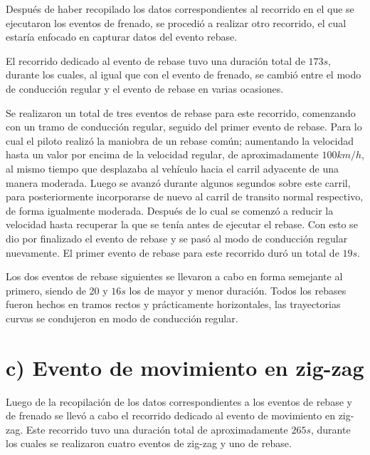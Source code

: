 Después de haber recopilado los datos correspondientes al recorrido en el que se ejecutaron los eventos de frenado, se procedió a realizar otro recorrido, el cual estaría enfocado en capturar datos del evento rebase.

El recorrido dedicado al evento de rebase tuvo una duración total de $173s$, durante los cuales, al igual que con el evento de frenado, se cambió entre el modo de conducción regular y el evento de rebase en varias ocasiones. 

Se realizaron un total de tres eventos de rebase para este recorrido, comenzando con un tramo de conducción regular, seguido del primer evento de rebase. 
Para lo cual el piloto realizó la maniobra de un rebase común; aumentando la velocidad hasta un valor por encima de la velocidad regular, de aproximadamente $100km/h$, al mismo tiempo que desplazaba al vehículo hacia el carril adyacente de una manera moderada. 
Luego se avanzó durante algunos segundos sobre este carril, para posteriormente incorporarse de nuevo al carril de transito normal respectivo, de forma igualmente moderada. 
Después de lo cual se comenzó a reducir la velocidad hasta recuperar la que se tenía antes de ejecutar el rebase. 
Con esto se dio por finalizado el evento de rebase y se pasó al modo de conducción regular nuevamente. 
El primer evento de rebase para este recorrido duró un total de $19s$.

Los dos eventos de rebase siguientes se llevaron a cabo en forma semejante al primero, siendo de 20 y $16s$ los de mayor y menor duración.
Todos los rebases fueron hechos en tramos rectos y prácticamente horizontales, las trayectorias curvas se condujeron en modo de conducción regular.

\section{c) Evento de movimiento en zig-zag}

Luego de la recopilación de los datos correspondientes a los eventos de rebase y de frenado se llevó a cabo el recorrido dedicado al evento de movimiento en zig-zag. 
Este recorrido tuvo una duración total de aproximadamente $265s$, durante los cuales se realizaron cuatro eventos de zig-zag y uno de rebase.

